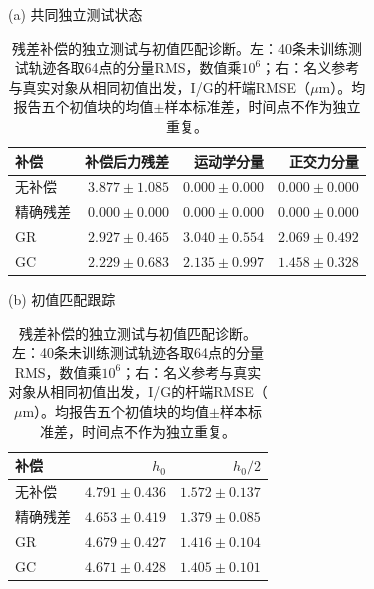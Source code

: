 \begin{table}[t]
\centering\small
\caption{残差补偿的独立测试与初值匹配诊断。左：40条未训练测试轨迹各取64点的分量RMS，数值乘$10^6$；右：名义参考与真实对象从相同初值出发，I/G的杆端RMSE（$\mu\mathrm m$）。均报告五个初值块的均值$\pm$样本标准差，时间点不作为独立重复。}
\label{tab:control_effectiveness}
\begin{minipage}[t]{0.49\textwidth}\centering\setlength{\tabcolsep}{3.5pt}
(a) 共同独立测试状态\par\smallskip
\begin{tabular}{lrrr}
\toprule
补偿 & 补偿后力残差 & 运动学分量 & 正交力分量 \\
\midrule
无补偿 & $3.877\pm1.085$ & $0.000\pm0.000$ & $0.000\pm0.000$ \\
精确残差 & $0.000\pm0.000$ & $0.000\pm0.000$ & $0.000\pm0.000$ \\
GR & $2.927\pm0.465$ & $3.040\pm0.554$ & $2.069\pm0.492$ \\
GC & $2.229\pm0.683$ & $2.135\pm0.997$ & $1.458\pm0.328$ \\
\bottomrule
\end{tabular}
\end{minipage}\hfill
\begin{minipage}[t]{0.49\textwidth}\centering
(b) 初值匹配跟踪\par\smallskip
\begin{tabular}{lrr}
\toprule
补偿 & $h_0$ & $h_0/2$ \\
\midrule
无补偿 & $4.791\pm0.436$ & $1.572\pm0.137$ \\
精确残差 & $4.653\pm0.419$ & $1.379\pm0.085$ \\
GR & $4.679\pm0.427$ & $1.416\pm0.104$ \\
GC & $4.671\pm0.428$ & $1.405\pm0.101$ \\
\bottomrule
\end{tabular}
\end{minipage}
\end{table}
